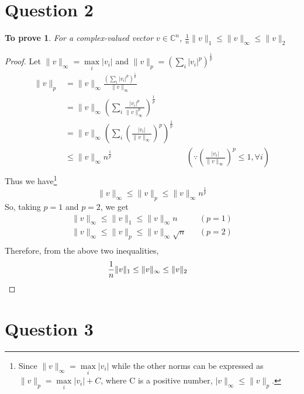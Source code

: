 \documentclass[11pt, oneside]{article}
\newtheorem*{remark}{To prove}
\begin{document}
\section*{Question 2}
  \begin{remark}
    For a complex-valued vector $v \in \mathbb{C}^n$, $\frac{1}{n}\|v\|_1 \leq \|v\|_{\infty} \leq \|v\|_2$
  \end{remark}
  \begin{proof}
    Let $\|v\|_{\infty} = \max\limits_i |v_i|$ and $\|v\|_p = \left(\sum\limits_i |v_i|^p \right)^{\frac{1}{p}}$
    \begin{align*}
      \|v\|_p &= \|v\|_{\infty} \frac{\left(\sum_i |v_i|^p\right)^{\frac{1}{p}}}{\|v\|_{\infty}} \\
              &= \|v\|_{\infty} \left(\sum_i\frac{|v_i|^p}{\|v\|_{\infty}^p}\right)^{\frac{1}{p}} \\
              &= \|v\|_{\infty} \left(\sum_i \left(\frac{|v_i|}{\|v\|_{\infty}}\right)^{p}\right)^{\frac{1}{p}} \\
              &\leq \|v\|_{\infty} n^{\frac{1}{p}} && \left(\because \left(\frac{|v_i|}{\|v\|_{\infty}}\right)^p \leq 1, \forall i\right) \\
    \end{align*}
    Thus we have\footnote{Since $\|v\|_{\infty} = \max\limits_i |v_i|$ while the other norms can be expressed as $\|v\|_{p} = \max\limits_i |v_i| + C$, where C is a positive number, $|v\|_{\infty} \leq \|v\|_{p}$.}
    \begin{equation*}
      \|v\|_{\infty} \leq \|v\|_{p} \leq \|v\|_{\infty} n^{\frac{1}{p}}
    \end{equation*}
    So, taking $p=1$ and $p=2$, we get
    \begin{align*}
      \|v\|_{\infty} \leq \|v\|_{1} \leq \|v\|_{\infty} n && (p=1)\\
      \|v\|_{\infty} \leq \|v\|_{p} \leq \|v\|_{\infty} \sqrt{n} && (p=2)\\
    \end{align*}
    Therefore, from the above two inequalities,
    \begin{align*}
      \frac{1}{n}\|v\|_1 \leq \|v\|_{\infty} \leq \|v\|_2 && \qedhere
    \end{align*}
  \end{proof}

\section*{Question 3}
\end{document}
